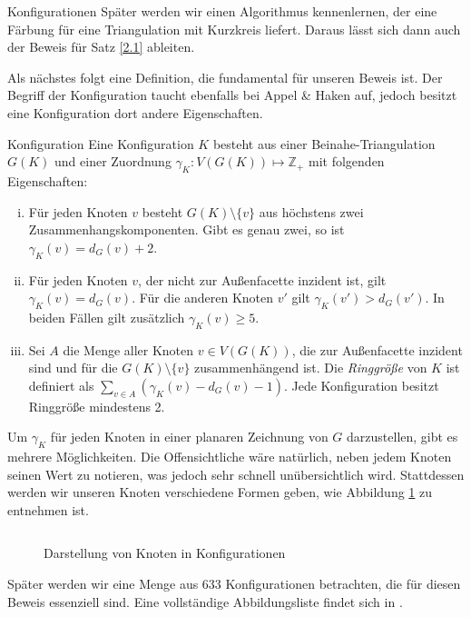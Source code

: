 \begin{section}{Konfigurationen}
 Später werden wir einen Algorithmus kennenlernen, der eine Färbung für eine Triangulation mit Kurzkreis liefert. Daraus lässt sich dann auch der Beweis für Satz \ref{2.1} ableiten.
 
 Als nächstes folgt eine Definition, die fundamental für unseren Beweis ist. Der Begriff der Konfiguration taucht ebenfalls bei Appel \& Haken auf, jedoch besitzt eine Konfiguration dort andere Eigenschaften.
  
 \begin{definition}{Konfiguration}
  Eine Konfiguration $K$ besteht aus einer Beinahe-Triangulation $G(K)$ und einer Zuordnung $\gamma_K : V(G(K)) \mapsto \mathbb{Z}_+$ mit folgenden Eigenschaften:
  \begin{enumerate}[i)]
   \item Für jeden Knoten $v$ besteht $G(K) \setminus \{v\}$ aus höchstens zwei Zusammenhangskomponenten. Gibt es genau zwei, so ist $\gamma_K(v) = d_G(v) + 2$.
   \item Für jeden Knoten $v$, der nicht zur Außenfacette inzident ist, gilt $\gamma_K(v) = d_G(v)$. Für die anderen Knoten $v'$ gilt $\gamma_K(v') > d_G(v')$. In beiden Fällen gilt zusätzlich $\gamma_K(v) \geq 5$.
   \item Sei $A$ die Menge aller Knoten $v \in V(G(K))$, die zur Außenfacette inzident sind und für die $G(K) \setminus \{v\}$ zusammenhängend ist. Die \textit{Ringgröße} von $K$ ist definiert als $\sum_{v\in A} (\gamma_K(v) - d_G(v) - 1)$. Jede Konfiguration besitzt Ringgröße mindestens 2.
  \end{enumerate}
 \end{definition}
 
 Um $\gamma_K$ für jeden Knoten in einer planaren Zeichnung von $G$ darzustellen, gibt es mehrere Möglichkeiten. Die Offensichtliche wäre natürlich, neben jedem Knoten seinen Wert zu notieren, was jedoch sehr schnell unübersichtlich wird. Stattdessen werden wir unseren Knoten verschiedene Formen geben, wie Abbildung \ref{fig1} zu entnehmen ist.
 
 \begin{figure}[ht]
  \label{fig1}
  \[  \]
  \caption[Darstellung von Knoten in Konfigurationen]{Darstellung von Knoten in Konfigurationen}
 \end{figure}

 
 Später werden wir eine Menge aus 633 Konfigurationen betrachten, die für diesen Beweis essenziell sind. Eine vollständige Abbildungsliste findet sich in \cite[Seite 35]{FourRSST}. 
 

\end{section}
